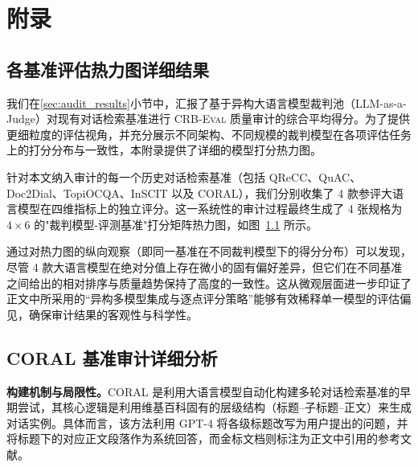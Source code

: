 \chapter[附录]{附\quad 录}%
\appendix %
\section{各基准评估热力图详细结果}
\label{app:heatmap_results}

我们在\ref{sec:audit_results}小节中，汇报了基于异构大语言模型裁判池（LLM-as-a-Judge）对现有对话检索基准进行 \textsc{CRB-Eval} 质量审计的综合平均得分。为了提供更细粒度的评估视角，并充分展示不同架构、不同规模的裁判模型在各项评估任务上的打分分布与一致性，本附录提供了详细的模型打分热力图。

\begin{figure}[htbp]
    \centering
    \label{fig:dataset-heatmeap}
\end{figure}
针对本文纳入审计的每一个历史对话检索基准（包括 QReCC、QuAC、Doc2Dial、TopiOCQA、InSCIT 以及 CORAL），我们分别收集了 4 款参评大语言模型在四维指标上的独立评分。这一系统性的审计过程最终生成了 4 张规格为 $4 \times 6$ 的"裁判模型-评测基准"打分矩阵热力图，如图~\ref{fig:dataset-heatmeap} 所示。

通过对热力图的纵向观察（即同一基准在不同裁判模型下的得分分布）可以发现，尽管 4 款大语言模型在绝对分值上存在微小的固有偏好差异，但它们在不同基准之间给出的相对排序与质量趋势保持了高度的一致性。这从微观层面进一步印证了正文中所采用的“异构多模型集成与逐点评分策略”能够有效稀释单一模型的评估偏见，确保审计结果的客观性与科学性。



\section{CORAL 基准审计详细分析}
\label{app:coral_audit}

\textbf{构建机制与局限性。}CORAL 是利用大语言模型自动化构建多轮对话检索基准的早期尝试，其核心逻辑是利用维基百科固有的层级结构（标题--子标题--正文）来生成对话实例。具体而言，该方法利用 GPT-4 将各级标题改写为用户提出的问题，并将标题下的对应正文段落作为系统回答，而金标文档则标注为正文中引用的参考文献。

